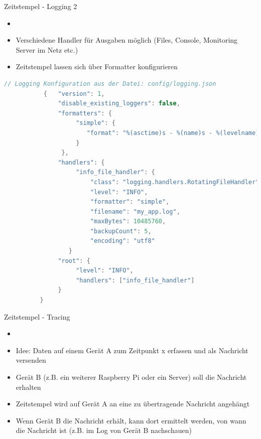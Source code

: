 \begin{frame}[fragile]{Zeitstempel - Logging 2}
    \begin{itemize}
        \setlength{\itemindent}{1.4in}
        \item [\textbf{Konfiguration der Logger}]
    \end{itemize}

    \begin{itemize}
         \item Verschiedene Handler für Ausgaben möglich (Files, Console, Monitoring Server im Netz etc.)
         \item Zeitstempel lassen sich über Formatter konfigurieren
     \end{itemize}

    \begin{lstlisting}[language=Java, gobble=8]
         // Logging Konfiguration aus der Datei: config/logging.json
           {   "version": 1,
               "disable_existing_loggers": false,
               "formatters": {
                    "simple": {
                       "format": "%(asctime)s - %(name)s - %(levelname)s - %(message)s"
                    }
                },
               "handlers": {
                    "info_file_handler": {
                        "class": "logging.handlers.RotatingFileHandler",
                        "level": "INFO",
                        "formatter": "simple",
                        "filename": "my_app.log",
                        "maxBytes": 10485760,
                        "backupCount": 5,
                        "encoding": "utf8"
                  }
               "root": {
                    "level": "INFO",
                    "handlers": ["info_file_handler"]
               }
          }
        \end{lstlisting}
\end{frame}


\begin{frame}[fragile]{Zeitstempel - Tracing}
    \begin{itemize}
        \setlength{\itemindent}{1.4in}
        \item [\textbf{Tracing von Nachrichten}]
    \end{itemize}

    \begin{itemize}
              \item Idee: Daten auf einem Gerät A zum Zeitpunkt x erfassen und als Nachricht versenden
               \item Gerät B (z.B. ein weiterer Raspberry Pi oder ein Server) soll die Nachricht erhalten
               \item Zeitstempel wird auf Gerät A an eine zu übertragende Nachricht angehängt
               \item Wenn Gerät B die Nachricht erhält, kann dort ermittelt werden, von wann die Nachricht ist (z.B. im Log von Gerät B nachschauen)
     \end{itemize}

\end{frame}


